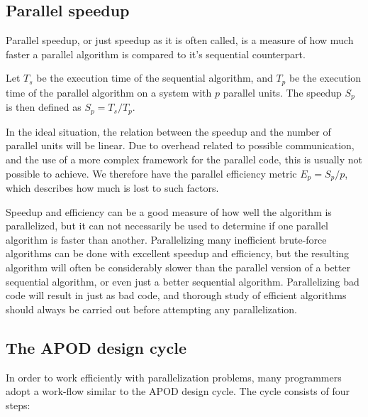 \subsection{Parallel speedup} %
\label{sub:parallel_speedup}

Parallel speedup, or just speedup as it is often called, is a measure of how much faster a parallel algorithm is compared to it's sequential counterpart.

Let $T_s$ be the execution time of the sequential algorithm, and $T_p$ be the execution time of the parallel algorithm on a system with $p$ parallel units. The speedup $S_p$ is then defined as $S_p = T_s / T_p$.

In the ideal situation, the relation between the speedup and the number of parallel units will be linear. Due to overhead related to possible communication, and the use of a more complex framework for the parallel code, this is usually not possible to achieve. We therefore have the parallel efficiency metric $E_p = S_p / p$, which describes how much is lost to such factors.

Speedup and efficiency can be a good measure of how well the algorithm is parallelized, but it can not necessarily be used to determine if one parallel algorithm is faster than another. Parallelizing many inefficient brute-force algorithms can be done with excellent speedup and efficiency, but the resulting algorithm will often be considerably slower than the parallel version of a better sequential algorithm, or even just a better sequential algorithm. Parallelizing bad code will result in just as bad code, and thorough study of efficient algorithms should always be carried out before attempting any parallelization.

\subsection{The APOD design cycle} %
\label{sub:the_apod_design_cycle}

In order to work efficiently with parallelization problems, many programmers adopt a work-flow similar to the APOD design cycle\citep[Assess, Parallelize, Optimize, Deploy]{cuda_c_best_practices_guide}. The cycle consists of four steps:

